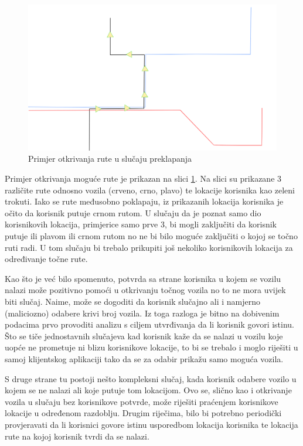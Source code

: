 \documentclass[times, utf8, diplomski]{fer}
\begin{document}
\begin{figure}[htb]
    \centering
    \includegraphics[width=1\textwidth]{images/calculating_route.png}
    \caption{Primjer otkrivanja rute u slučaju preklapanja}\label{fig:calculating_route}
\end{figure}

Primjer otkrivanja moguće rute je prikazan na slici \ref{fig:calculating_route}. Na slici su prikazane 3 različite rute odnosno vozila (crveno, crno, plavo) te lokacije korisnika kao zeleni trokuti. Iako se rute međusobno poklapaju, iz prikazanih lokacija korisnika je očito da korisnik putuje crnom rutom. U slučaju da je poznat samo dio korisnikovih lokacija, primjerice samo prve 3, bi mogli zaključiti da korisnik putuje ili plavom ili crnom rutom no ne bi bilo moguće zaključiti o kojoj se točno ruti radi. U tom slučaju bi trebalo prikupiti još nekoliko korisnikovih lokacija za određivanje točne rute.

Kao što je već bilo spomenuto, potvrda sa strane korisnika u kojem se vozilu nalazi može pozitivno pomoći u otkrivanju točnog vozila no to ne mora uvijek biti slučaj. Naime, može se dogoditi da korisnik slučajno ali i namjerno (maliciozno) odabere krivi broj vozila. Iz toga razloga je bitno na dobivenim podacima prvo provoditi analizu s ciljem utvrđivanja da li korisnik govori istinu. Što se tiče jednostavnih slučajeva kad korisnik kaže da se nalazi u vozilu koje uopće ne prometuje ni blizu korisnikove lokacije, to bi se trebalo i moglo riješiti u samoj klijentskog aplikaciji tako da se za odabir prikažu samo moguća vozila.

S druge strane tu postoji nešto kompleksni slučaj, kada korisnik odabere vozilo u kojem se ne nalazi ali koje putuje tom lokacijom. Ovo se, slično kao i otkrivanje vozila u slučaju bez korisnikove potvrde, može riješiti praćenjem korisnikove lokacije u određenom razdoblju. Drugim riječima, bilo bi potrebno periodički provjeravati da li korisnici govore istinu usporedbom lokacija korisnika te lokacija rute na kojoj korisnik tvrdi da se nalazi.
\end{document}
